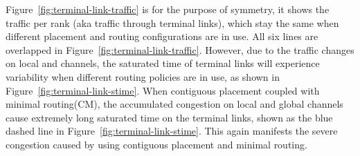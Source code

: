 Figure~\ref{fig:terminal-link-traffic} is for the purpose of symmetry, 
it shows the traffic per rank (aka traffic through terminal links), 
which stay the same when different placement and routing configurations are in use. 
All six lines are overlapped in Figure~\ref{fig:terminal-link-traffic}. 
However, due to the traffic changes on local and channels, 
the saturated time of terminal links will experience variability when different routing policies are in use, as shown in Figure~\ref{fig:terminal-link-stime}. 
When contiguous placement coupled with minimal routing(CM), 
the accumulated congestion on local and global channels cause extremely long saturated time on the terminal links, 
shown as the blue dashed line in Figure~\ref{fig:terminal-link-stime}. 
This again manifests the severe congestion caused by using contiguous placement and minimal routing. 


%
%
%
%
%
%




